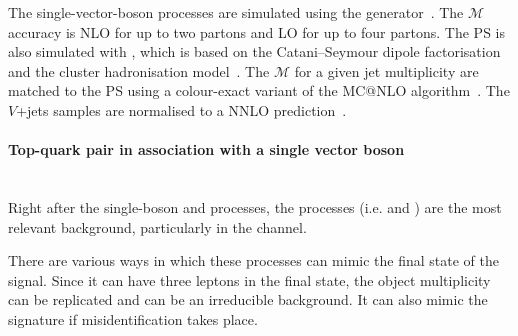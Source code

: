 The single-vector-boson processes are
simulated using the \SHERPA[2.2.1] generator~\cite{Bothmann:2019yzt}. 
The $\mathcal{M}$ accuracy is NLO for up to two partons and LO for
up to four partons.  The PS is also simulated with \SHERPA, which is based on%
the Catani--Seymour dipole factorisation and the cluster hadronisation model~\cite{Winter:2003tt}.
The $\mathcal{M}$ for a given jet multiplicity are matched to the PS using a colour-exact variant 
of the MC@NLO algorithm~\cite{Hoeche:2011fd}.  
The $V$+jets samples are normalised to a NNLO
prediction~\cite{Anastasiou:2003ds}.

\paragraph{Top-quark pair in association with a single vector boson}\mbox{}\\
Right after the single-boson and \ttbar processes, the \ttV processes (i.e. \ttZ and \ttW)
are the most relevant background, particularly in the \dilepSStau channel. %

There are various ways in which these processes can mimic the final state of the signal.
Since it can have three leptons in the final state, the object multiplicity can be replicated and
\ttW can be an irreducible background. It can also mimic the \dileptau signature if misidentification
takes place.




